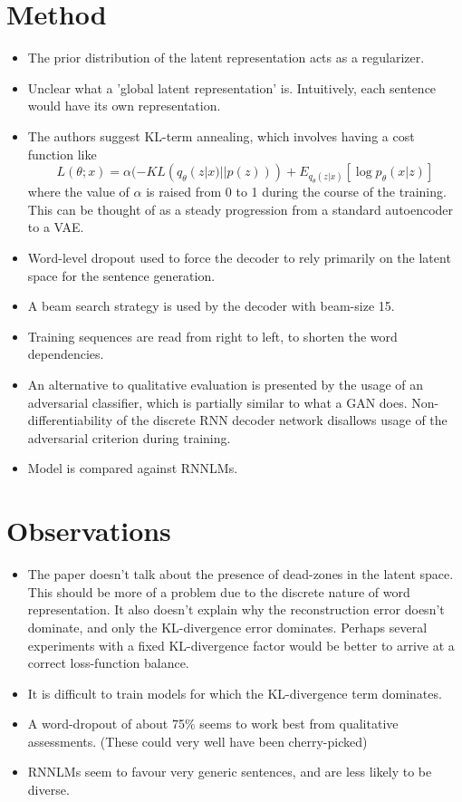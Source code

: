 \documentclass[12pt]{scrartcl}
\begin{document}
\section{Method}
  \begin{itemize}
    \item The prior distribution of the latent representation acts as a regularizer.
    \item Unclear what a 'global latent representation' is. Intuitively, each sentence would have its own representation.
    \item The authors suggest KL-term annealing, which involves having a cost function like
    $$L(\theta; x) = \alpha (-KL(q_{\theta}(z|x)||p(z))) + E_{q_{\theta}(z|x)}[\log p_{\theta}(x|z)]$$ where the value of $\alpha$ is raised from 0 to 1 during the course of the training. This can be thought of as a steady progression from a standard autoencoder to a VAE.
    \item Word-level dropout used to force the decoder to rely primarily on the latent space for the sentence generation.
    \item A beam search strategy is used by the decoder with beam-size 15.
    \item Training sequences are read from right to left, to shorten the word dependencies.
    \item An alternative to qualitative evaluation is presented by the usage of an adversarial classifier, which is partially similar to what a GAN does. Non-differentiability of the discrete RNN decoder network disallows usage of the adversarial criterion during training.
    \item Model is compared against RNNLMs. \cite{mikolov2011extensions}
  \end{itemize}

\section{Observations}
  \begin{itemize}
    \item The paper doesn't talk about the presence of dead-zones in the latent space. This should be more of a problem due to the discrete nature of word representation. It also doesn't explain why the reconstruction error doesn't dominate, and only the KL-divergence error dominates. Perhaps several experiments with a fixed KL-divergence factor would be better to arrive at a correct loss-function balance.
    \item It is difficult to train models for which the KL-divergence term dominates.
    \item A word-dropout of about 75\% seems to work best from qualitative assessments. (These could very well have been cherry-picked)
    \item RNNLMs seem to favour very generic sentences, and are less likely to be diverse.
  \end{itemize}



\end{document}
